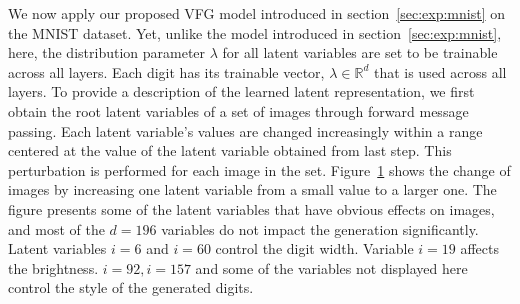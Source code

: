 \documentclass[twoside]{article}
\begin{document}
\begin{figure}[H]
\begin{center}
{						  
		}
	\end{center}
  \label{fig:mnist_dis}
\end{figure}

We now apply our proposed VFG model introduced in section~\ref{sec:exp:mnist} on the MNIST dataset. 
Yet, unlike the model introduced in section~\ref{sec:exp:mnist}, here, the distribution parameter $\lambda$ for all latent variables are set to be trainable across all layers.  
Each digit has its trainable vector,  $\lambda \in \mathbb{R}^d$ that is used across all layers. 
To provide a description of the learned latent representation, we first obtain the root latent variables of a set of images through forward message passing. Each latent variable's values are changed increasingly within a range centered at the value of the latent variable obtained from last step. 
This perturbation is performed for each image in the set.
Figure~\ref{fig:mnist_dis} shows the change of images by increasing one latent variable from a small value to a larger one. The figure presents some of the latent variables that have obvious effects on images, and most of the $d=196$ variables do not impact the generation significantly. Latent variables $i=6$ and $i=60$ control the digit width. Variable $i=19$ affects the brightness.  $i=92, i=157$ and some of the variables not displayed here control the style of the generated digits. 
\end{document}
